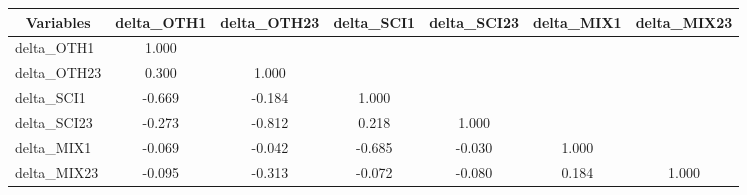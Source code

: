 \begin{center}
\begin{tabular}{l  c  c  c  c  c  c }\hline\hline
\multicolumn{1}{c}{Variables} &delta\_OTH1&delta\_OTH23&delta\_SCI1&delta\_SCI23&delta\_MIX1&delta\_MIX23\\ \hline
delta\_OTH1&1.000\\
delta\_OTH23&0.300&1.000\\
delta\_SCI1&-0.669&-0.184&1.000\\
delta\_SCI23&-0.273&-0.812&0.218&1.000\\
delta\_MIX1&-0.069&-0.042&-0.685&-0.030&1.000\\
delta\_MIX23&-0.095&-0.313&-0.072&-0.080&0.184&1.000\\
\hline \hline 
 \end{tabular}
 \end{center}
